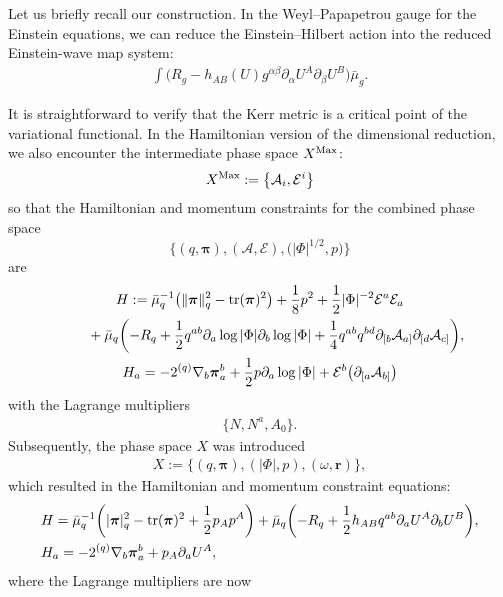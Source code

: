 \documentclass[11pt]{article}
\numberwithin{equation}{section}
\def\ptl{\partial}%
\def\mbo#1{\boldsymbol{#1}}%
\def\grad{{\nabla}}%
\newcommand{\leftexp}[2]{{\vphantom{#2}}^{#1}{#2}}
\def\halb{\frac{1}{2}}%
\def \a{\alpha}
\def \b {\beta}
\renewcommand{\a}{\alpha}
\renewcommand{\b}{\beta}
\numberwithin{equation}{section}
\begin{document}
Let us briefly recall our construction. In the Weyl--Papapetrou gauge for the Einstein equations, we can reduce the Einstein--Hilbert action
into the reduced Einstein-wave map system:
\begin{align*}
\int \bigl(R_g - h_{AB}(U) g^{\a \b} \ptl_\a U^A \ptl_\b U^B\bigr) \bar{\mu}_g.
\end{align*}

It is straightforward to verify that the Kerr metric is a critical point of the variational functional. In the Hamiltonian version of the dimensional reduction, we also encounter the intermediate phase space $X^{{\rm Max}}$:
\begin{align*}
	X^{{\rm Max}} := \bigl\{\mathcal{A}_i, \mathcal{E}^i \bigr\}
	\end{align*}
	so that the Hamiltonian and momentum constraints for the combined phase space
 \[
 \bigl\{ (q, \mbo{\pi}), (\mathcal{A}, \mathcal{E}), \bigl(\vert \Phi \vert^{1/2}, p\bigr) \bigr\}
 \]
are 	
	\begin{gather*}
	H := \bar{\mu}^{-1}_q \bigl(\Vert \mbo{\pi} \Vert^2_q - {\rm tr}(\mbo{\pi})^2\bigr) + \frac{1}{8} p^2 + \frac{1}{2} \vert \Phi \vert^{-2} \mathcal{E}^a \mathcal{E}_a \\
\hphantom{H :=}{}
	 + \bar{\mu}_q \biggl(-R_q + \halb q^{ab} \ptl_a \log \vert \Phi \vert \ptl_b \log \vert \Phi \vert
	 + \frac{1}{4} q^{ab} q^{bd} \ptl_{[b} \mathcal{A}_{a]} \ptl_{[d} \mathcal{A}_{c]} \biggr), \\
	H_a = -2 \leftexp{(q)}{\grad}_b \mbo{\pi}^b_a + \halb p \ptl_a \log \vert \Phi \vert + \mathcal{E}^b \bigl(\ptl_{[a} \mathcal{A}_{b]}\bigr)
	\end{gather*}
	with the Lagrange multipliers
	\begin{align*}
	\{ N, N^a, A_0\}.
	\end{align*}
	Subsequently, the phase space $X$ was introduced
	\begin{align*}
	X := \{ (q, \mbo{\pi}), (\vert \Phi \vert, p), (\omega, \mbo{r}) \},
	\end{align*}
	which resulted in the Hamiltonian and momentum constraint equations:
	\begin{align*}
	&H= \bar{\mu}^{-1}_q \biggl(\vert \mbo{\pi} \vert^2_q - {\rm tr} (\mbo{\pi})^2 + \halb p_A p^A\biggr) + \bar{\mu}_q \biggl(- R_q + \halb h_{AB} q^{ab} \ptl_a U^A \ptl_b U^B\biggr) ,\\
	&H_a= -2 \leftexp{(q)}{\grad}_b \mbo{\pi}^b_a + p_A \ptl_a U^A,
	\end{align*}
	where the Lagrange multipliers are now	
\end{document}
